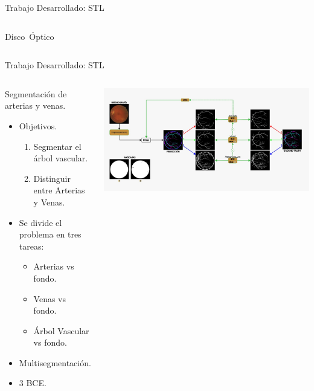 \documentclass[xcolor=dvipsnames,table]{beamer}
\begin{document}
\begin{frame}{Trabajo Desarrollado: STL }
\begin{columns}[T]
\begin{minipage}[t]{0.35\textwidth}
		{\small \mbox{Disco Óptico}}
	\end{minipage}
\end{columns}
\end{frame}


\begin{frame}{Trabajo Desarrollado: STL}
	\begin{columns}[T]
		\vspace{0.5cm} %
				\vspace{-0.9cm}
		\begin{block}{Segmentación de arterias y venas.}
			\begin{itemize}
				\item Objetivos.
				\begin{enumerate}
					\item Segmentar el árbol vascular.
					\item Distinguir entre Arterias y Venas.
				\end{enumerate}
				\item Se divide el problema en tres tareas:
				\begin{itemize}
					\item Arterias vs fondo.
					\item Venas vs fondo.
					\item Árbol Vascular vs fondo.
				\end{itemize}
				\item Multisegmentación.
				\item 3 BCE.
			\end{itemize}
		\end{block}
		\vspace{2cm} %
		\begin{minipage}[t]{1.2\textwidth}
			\centering
			\hspace{-1.1cm}
			\includegraphics[width=\textwidth]{my_images/ML/AV.jpg}
		\end{minipage}
	\end{columns}
\end{frame}
\end{document}

